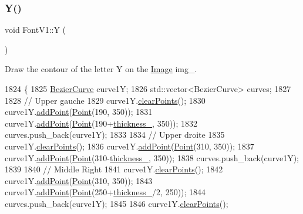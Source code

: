 \subsubsection{\texorpdfstring{Y()}{Y()}}
{\footnotesize\ttfamily void Font\+V1\+::Y (\begin{DoxyParamCaption}{ }\end{DoxyParamCaption})}



Draw the contour of the letter Y on the \mbox{\hyperlink{class_image}{Image}} img\+\_\+. 


\begin{DoxyCode}
1824               \{
1825     \mbox{\hyperlink{class_bezier_curve}{BezierCurve}} curve1Y;
1826     std::vector<BezierCurve> curves;
1827 
1828     \textcolor{comment}{// Upper gauche}
1829     curve1Y.\mbox{\hyperlink{class_bezier_curve_a0ba8ce66d5af5971ae6a1b506029728e}{clearPoints}}();
1830     curve1Y.\mbox{\hyperlink{class_bezier_curve_a38d16c18b36ae45619b05e26e226cf34}{addPoint}}(\mbox{\hyperlink{class_point}{Point}}(190, 350));
1831     curve1Y.\mbox{\hyperlink{class_bezier_curve_a38d16c18b36ae45619b05e26e226cf34}{addPoint}}(\mbox{\hyperlink{class_point}{Point}}(190+\mbox{\hyperlink{class_font_v1_aed8040e76be9a52833627b92f0fb4e5f}{thickness\_}}, 350));
1832     curves.push\_back(curve1Y);
1833 
1834     \textcolor{comment}{// Upper droite}
1835     curve1Y.\mbox{\hyperlink{class_bezier_curve_a0ba8ce66d5af5971ae6a1b506029728e}{clearPoints}}();
1836     curve1Y.\mbox{\hyperlink{class_bezier_curve_a38d16c18b36ae45619b05e26e226cf34}{addPoint}}(\mbox{\hyperlink{class_point}{Point}}(310, 350));
1837     curve1Y.\mbox{\hyperlink{class_bezier_curve_a38d16c18b36ae45619b05e26e226cf34}{addPoint}}(\mbox{\hyperlink{class_point}{Point}}(310-\mbox{\hyperlink{class_font_v1_aed8040e76be9a52833627b92f0fb4e5f}{thickness\_}}, 350));
1838     curves.push\_back(curve1Y);
1839 
1840     \textcolor{comment}{// Middle Right}
1841     curve1Y.\mbox{\hyperlink{class_bezier_curve_a0ba8ce66d5af5971ae6a1b506029728e}{clearPoints}}();
1842     curve1Y.\mbox{\hyperlink{class_bezier_curve_a38d16c18b36ae45619b05e26e226cf34}{addPoint}}(\mbox{\hyperlink{class_point}{Point}}(310, 350));
1843     curve1Y.\mbox{\hyperlink{class_bezier_curve_a38d16c18b36ae45619b05e26e226cf34}{addPoint}}(\mbox{\hyperlink{class_point}{Point}}(250+\mbox{\hyperlink{class_font_v1_aed8040e76be9a52833627b92f0fb4e5f}{thickness\_}}/2, 250));
1844     curves.push\_back(curve1Y);
1845 
1846     curve1Y.\mbox{\hyperlink{class_bezier_curve_a0ba8ce66d5af5971ae6a1b506029728e}{clearPoints}}();

\end{DoxyCode}

